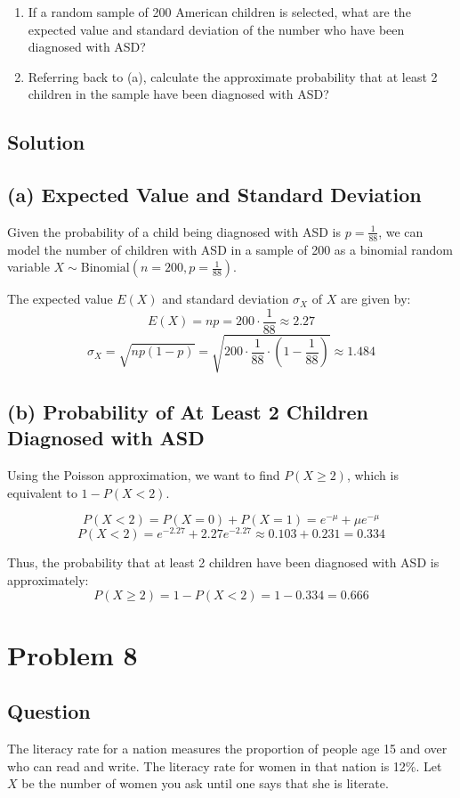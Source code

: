 \documentclass{article}
\begin{document}
\begin{enumerate}
    \item If a random sample of 200 American children is selected, what are the expected value and standard deviation of the number who have been diagnosed with ASD?
    \item Referring back to (a), calculate the approximate probability that at least 2 children in the sample have been diagnosed with ASD?
\end{enumerate}
\subsection*{Solution}
\subsection*{(a) Expected Value and Standard Deviation}

Given the probability of a child being diagnosed with ASD is \(p = \frac{1}{88}\), we can model the number of children with ASD in a sample of 200 as a binomial random variable \(X \sim \text{Binomial}(n = 200, p = \frac{1}{88})\).

The expected value \(E(X)\) and standard deviation \(\sigma_X\) of \(X\) are given by:
\[
E(X) = np = 200 \cdot \frac{1}{88} \approx 2.27
\]
\[
\sigma_X = \sqrt{np(1-p)} = \sqrt{200 \cdot \frac{1}{88} \cdot \left(1 - \frac{1}{88}\right)} \approx 1.484
\]

\subsection*{(b) Probability of At Least 2 Children Diagnosed with ASD}

Using the Poisson approximation, we want to find \(P(X \geq 2)\), which is equivalent to \(1 - P(X < 2)\).

\[
P(X < 2) = P(X = 0) + P(X = 1) = e^{-\mu} + \mu e^{-\mu}
\]
\[
P(X < 2) = e^{-2.27} + 2.27 e^{-2.27} \approx 0.103 + 0.231 = 0.334
\]

Thus, the probability that at least 2 children have been diagnosed with ASD is approximately:
\[
P(X \geq 2) = 1 - P(X < 2) = 1 - 0.334 = 0.666
\]

\section*{Problem 8}
\subsection*{Question}
The literacy rate for a nation measures the proportion of people age 15 and over who can read and write. The literacy rate for women in that nation is 12\%. Let \(X\) be the number of women you ask until one says that she is literate.
\end{document}
